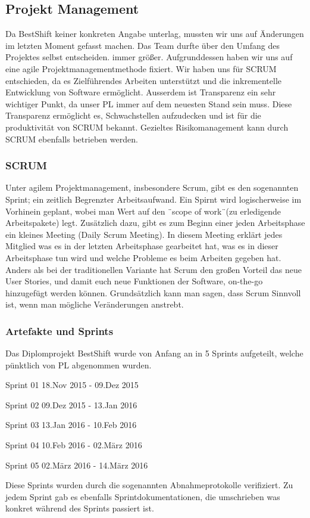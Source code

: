 \subsection{Projekt Management}

Da BestShift keiner konkreten Angabe unterlag,
mussten wir uns auf Änderungen im letzten Moment gefasst machen. Das Team 
durfte über den Umfang des Projektes selbst entscheiden.
immer größer. Aufgrunddessen haben wir uns auf eine agile Projektmanagementmethode fixiert. 
Wir haben uns für SCRUM entschieden, da es Zielführendes Arbeiten unterstützt und die inkrementelle Entwicklung
von Software ermöglicht. Ausserdem ist Transparenz ein sehr wichtiger Punkt, da unser PL immer auf dem neuesten
Stand sein muss. Diese Transparenz ermöglicht es, Schwachstellen aufzudecken und ist für die produktivität von SCRUM bekannt.
Gezieltes Risikomanagement kann durch SCRUM ebenfalls betrieben werden. 


\subsubsection{SCRUM}
Unter agilem Projektmanagement, insbesondere Scrum, gibt es den sogenannten
Sprint; ein zeitlich Begrenzter Arbeitsaufwand. Ein Spirnt wird logischerweise
im Vorhinein geplant, wobei man Wert auf den ¨scope of work¨(zu erledigende
Arbeitspakete) legt. Zusätzlich dazu, gibt es zum Beginn einer jeden
Arbeitsphase ein kleines Meeting (Daily Scrum Meeting). In diesem Meeting
erklärt jedes Mitglied was es in der letzten Arbeitsphase gearbeitet hat, was es in
dieser Arbeitsphase tun wird und welche Probleme es beim Arbeiten gegeben
hat.
Anders als bei der traditionellen Variante hat Scrum den großen Vorteil das neue
User Stories, und damit euch neue Funktionen der Software, on-the-go hinzugefügt
werden können. Grundsätzlich kann man sagen, dass Scrum Sinnvoll ist,
wenn man mögliche Veränderungen anstrebt.

\subsubsection{Artefakte und Sprints}
Das Diplomprojekt BestShift wurde von Anfang an in 5 Sprints aufgeteilt, welche pünktlich von PL abgenommen wurden.
\begin{description}
\item Sprint 01 18.Nov 2015 - 09.Dez 2015
\item Sprint 02 09.Dez 2015 - 13.Jan 2016
\item Sprint 03 13.Jan 2016 - 10.Feb 2016
\item Sprint 04 10.Feb 2016 - 02.März 2016
\item Sprint 05 02.März 2016 - 14.März 2016
\end{description}

Diese Sprints wurden durch die sogenannten Abnahmeprotokolle verifiziert.
Zu jedem Sprint gab es ebenfalls Sprintdokumentationen, die umschrieben was konkret 
während des Sprints passiert ist.


\clearpage %